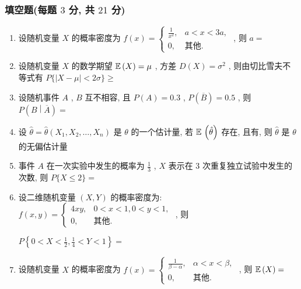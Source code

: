 \subsubsection{填空题(每题 $3$ 分, 共 $21$ 分)}
\begin{enumerate}
	\item 设随机变量 $X$ 的概率密度为 $f(x)=
	\begin{cases}
		\frac{1}{x^2}, & a<x<3a,\\
		0, & \text{其他}.
	\end{cases}$ , 则 $a=$\underline{\hspace{8pc}}

	\item 设随机变量 $X$ 的数学期望 $\mathbb{E}\,(X)=\mu$ , 方差 $D(X)=\sigma^2$ , 则由切比雪夫不等式有 $P\{ |X-\mu|<2\sigma \} \geq$\underline{\hspace{8pc}}
	
	\item 设随机事件 $A$ , $B$ 互不相容, 且 $P(A)=0.3$ , $P\left( \overline{B} \right)=0.5$ , 则 $P\left( B\middle|\overline{A} \right)=$\underline{\hspace{8pc}}
	
	\item 设 $\hat{\theta}=\hat{\theta}(X_1,X_2,\ldots,X_n)$ 是 $\theta$ 的一个估计量, 若 $\mathbb{E}\,\left( \hat{\theta} \right)$ 存在, 且有\underline{\hspace{8pc}}, 则 $\hat{\theta}$ 是 $\theta$ 的无偏估计量
	
	\item 事件 $A$ 在一次实验中发生的概率为 $\frac{1}{3}$ , $X$ 表示在 $3$ 次重复独立试验中发生的次数, 则 $P\{ X\leq 2 \}=$\underline{\hspace{8pc}}
	
	\item 设二维随机变量 $(X,Y)$ 的概率密度为: $f(x,y)=
	\begin{cases}
		4xy, & 0<x<1,0<y<1,\\
		0, & \text{其他}.
	\end{cases}
	$ , 则
	
	$P\left\{ 0<X<\frac{1}{2},\frac{1}{4}<Y<1 \right\}=$\underline{\hspace{8pc}}

	\item 设随机变量 $X$ 的概率密度为 $f(x)=
	\begin{cases}
		\frac{1}{\beta-\alpha}, & \alpha<x<\beta,\\
		0, & \text{其他}.
	\end{cases}
	$ , 则 $\mathbb{E}\,(X)=$\underline{\hspace{8pc}}
\end{enumerate}


